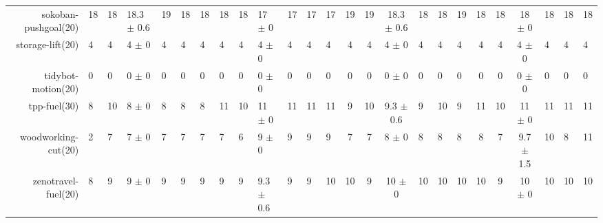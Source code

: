 \begin{center}
\begin{tabular}{|rHHHHHHHHHHHHcccHHH|cccHHH|}
sokoban-pushgoal(20) & 18 & 18 & 18.3 $\pm$ 0.6 & 19 & 18 & 18 & 18 & 18 & 17 $\pm$ 0 & 17 & 17 & 17 & 19 & 19 & 18.3 $\pm$ 0.6 & 18 & 18 & 19 & 18 & 18 & 18 $\pm$ 0 & 18 & 18 & 18\\
storage-lift(20) & 4 & 4 & 4 $\pm$ 0 & 4 & 4 & 4 & 4 & 4 & 4 $\pm$ 0 & 4 & 4 & 4 & 4 & 4 & 4 $\pm$ 0 & 4 & 4 & 4 & 4 & 4 & 4 $\pm$ 0 & 4 & 4 & 4\\
tidybot-motion(20) & 0 & 0 & 0 $\pm$ 0 & 0 & 0 & 0 & 0 & 0 & 0 $\pm$ 0 & 0 & 0 & 0 & 0 & 0 & 0 $\pm$ 0 & 0 & 0 & 0 & 0 & 0 & 0 $\pm$ 0 & 0 & 0 & 0\\
tpp-fuel(30) & 8 & 10 & 8 $\pm$ 0 & 8 & 8 & 8 & 11 & 10 & 11 $\pm$ 0 & 11 & 11 & 11 & 9 & 10 & 9.3 $\pm$ 0.6 & 9 & 10 & 9 & 11 & 10 & 11 $\pm$ 0 & 11 & 11 & 11\\
woodworking-cut(20) & 2 & 7 & 7 $\pm$ 0 & 7 & 7 & 7 & 7 & 6 & 9 $\pm$ 0 & 9 & 9 & 9 & 7 & 7 & 8 $\pm$ 0 & 8 & 8 & 8 & 8 & 7 & 9.7 $\pm$ 1.5 & 10 & 8 & 11\\
zenotravel-fuel(20) & 8 & 9 & 9 $\pm$ 0 & 9 & 9 & 9 & 9 & 9 & 9.3 $\pm$ 0.6 & 9 & 9 & 10 & 10 & 9 & 10 $\pm$ 0 & 10 & 10 & 10 & 10 & 9 & 10 $\pm$ 0 & 10 & 10 & 10\\
\end{tabular}
\end{center}
